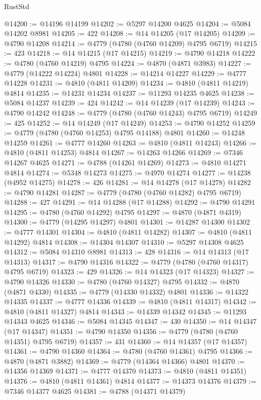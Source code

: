 \begin{lexlean}{RustStd}
\begin{coremodule}
@14200 := @14196 @14199
@14202 := @5297 @14200 @4625
@14204 := @5084 @14202 @8981
@14205 := 422
@14208 := @14 @14205 (@17 @14205)
@14209 := @4790 @14208
@14214 := @4779 (@4780 (@4760 @14209) @4795 @6719)
@14215 := 423
@14218 := @14 @14215 (@17 @14215)
@14219 := @4790 @14218
@14222 := @4780 (@4760 @14219) @4795
@14224 := @4870 (@4871 @3983)
@14227 := @4779 (@14222 @14224) @4801
@14228 := @14214 @14227
@14229 := @4777 @14228
@14231 := @4810 (@4811 @14209)
@14234 := @4810 (@4811 @14219) @4814
@14235 := @14231 @14234
@14237 := @11293 @14235 @4625
@14238 := @5084 @14237
@14239 := 424
@14242 := @14 @14239 (@17 @14239)
@14243 := @4790 @14242
@14248 := @4779 (@4780 (@4760 @14243) @4795 @6719)
@14249 := 425
@14252 := @14 @14249 (@17 @14249)
@14253 := @4790 @14252
@14259 := @4779 (@4780 (@4760 @14253) @4795 @14188) @4801
@14260 := @14248 @14259
@14261 := @4777 @14260
@14263 := @4810 (@4811 @14243)
@14266 := @4810 (@4811 @14253) @4814
@14267 := @14263 @14266
@14269 := @7346 @14267 @4625
@14271 := @4788 (@14261 @14269)
@14273 := @4810 @14271 @4814
@14274 := @5348 @14273
@14275 := @4970 @14274
@14277 := @14238 (@4952 @14275)
@14278 := 426
@14281 := @14 @14278 (@17 @14278)
@14282 := @4790 @14281
@14287 := @4779 (@4780 (@4760 @14282) @4795 @6719)
@14288 := 427
@14291 := @14 @14288 (@17 @14288)
@14292 := @4790 @14291
@14295 := @4780 (@4760 @14292) @4795
@14297 := @4870 (@4871 @4319)
@14300 := @4779 (@14295 @14297) @4801
@14301 := @14287 @14300
@14302 := @4777 @14301
@14304 := @4810 (@4811 @14282)
@14307 := @4810 (@4811 @14292) @4814
@14308 := @14304 @14307
@14310 := @5297 @14308 @4625
@14312 := @5084 @14310 @8981
@14313 := 428
@14316 := @14 @14313 (@17 @14313)
@14317 := @4790 @14316
@14322 := @4779 (@4780 (@4760 @14317) @4795 @6719)
@14323 := 429
@14326 := @14 @14323 (@17 @14323)
@14327 := @4790 @14326
@14330 := @4780 (@4760 @14327) @4795
@14332 := @4870 (@4871 @4330)
@14335 := @4779 (@14330 @14332) @4801
@14336 := @14322 @14335
@14337 := @4777 @14336
@14339 := @4810 (@4811 @14317)
@14342 := @4810 (@4811 @14327) @4814
@14343 := @14339 @14342
@14345 := @11293 @14343 @4625
@14346 := @5084 @14345
@14347 := 430
@14350 := @14 @14347 (@17 @14347)
@14351 := @4790 @14350
@14356 := @4779 (@4780 (@4760 @14351) @4795 @6719)
@14357 := 431
@14360 := @14 @14357 (@17 @14357)
@14361 := @4790 @14360
@14364 := @4780 (@4760 @14361) @4795
@14366 := @4870 (@4871 @3882)
@14369 := @4779 (@14364 @14366) @4801
@14370 := @14356 @14369
@14371 := @4777 @14370
@14373 := @4810 (@4811 @14351)
@14376 := @4810 (@4811 @14361) @4814
@14377 := @14373 @14376
@14379 := @7346 @14377 @4625
@14381 := @4788 (@14371 @14379)

\end{coremodule}
\end{lexlean}
